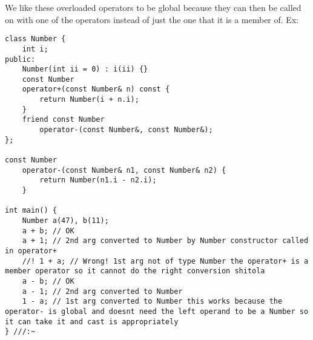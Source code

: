 \documentclass[12pt]{article}
\begin{document}
We like these overloaded operators to be global because they can then be called on with one of the operators instead of just the one that it is a member of. Ex:
\begin{lstlisting}
class Number {
    int i;
public:
    Number(int ii = 0) : i(ii) {}
    const Number
    operator+(const Number& n) const {
        return Number(i + n.i);
    }
    friend const Number
        operator-(const Number&, const Number&);
};

const Number
    operator-(const Number& n1, const Number& n2) {
        return Number(n1.i - n2.i);
    }

int main() {
    Number a(47), b(11);
    a + b; // OK
    a + 1; // 2nd arg converted to Number by Number constructor called in operator+
    //! 1 + a; // Wrong! 1st arg not of type Number the operator+ is a member operator so it cannot do the right conversion shitola
    a - b; // OK
    a - 1; // 2nd arg converted to Number
    1 - a; // 1st arg converted to Number this works because the operator- is global and doesnt need the left operand to be a Number so it can take it and cast is appropriately
} ///:~
\end{lstlisting}
\end{document}
